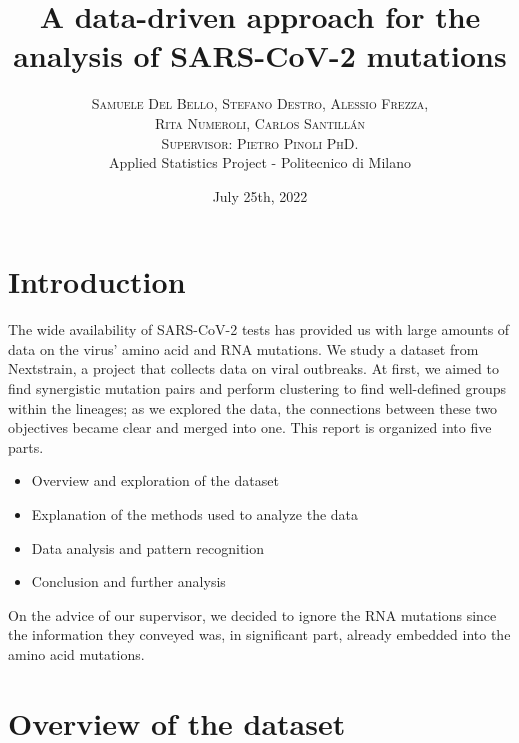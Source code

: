 \documentclass[twoside,twocolumn]{article}
\title{A data-driven approach for the analysis of SARS-CoV-2 mutations} %
\author{%
	\textsc{Samuele Del Bello, Stefano Destro, Alessio Frezza,}\\
	\textsc{Rita Numeroli, Carlos Santillán} \\[1ex] %
	\textsc{Supervisor: Pietro Pinoli PhD.}\\
	\normalsize  Applied Statistics Project - Politecnico di Milano \\
}
\date{July 25th, 2022}
\begin{document}
	\maketitle

	\section{Introduction}
	
	The wide availability of SARS-CoV-2 tests has provided us with large amounts of data on the virus' amino acid and RNA mutations. We study a dataset from Nextstrain\cite{nextstrainbook}, a project that collects data on viral outbreaks. At first, we aimed to find synergistic mutation pairs and perform clustering to find well-defined groups within the lineages; as we explored the data, the connections between these two objectives became clear and merged into one. This report is organized into five parts.
	\begin{itemize}
		\item Overview and exploration of the dataset 
		\item Explanation of the methods used to analyze the data
		\item Data analysis and pattern recognition
		\item Conclusion and further analysis
	\end{itemize}
	On the advice of our supervisor, we decided to ignore the RNA mutations since the information they conveyed was, in significant part, already embedded into the amino acid mutations.
	
	\section{Overview of the dataset}
	
\end{document}
